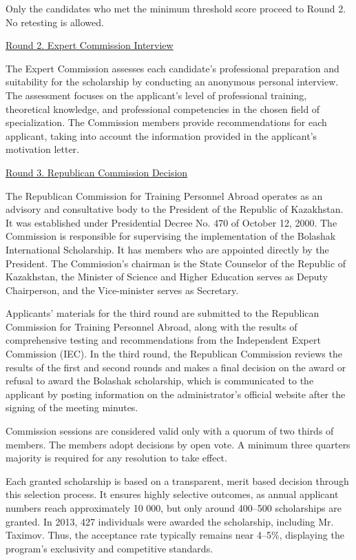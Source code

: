 Only the candidates who met the minimum threshold score proceed to Round 2. No retesting is allowed.

\underline{Round 2. Expert Commission Interview}

The Expert Commission assesses each candidate's professional preparation and suitability for the scholarship by conducting an anonymous personal interview. The assessment focuses on the applicant's level of professional training, theoretical knowledge, and professional competencies in the chosen field of specialization. The Commission members provide recommendations for each applicant, taking into account the information provided in the applicant's motivation letter.

\underline{Round 3. Republican Commission Decision}

The Republican Commission for Training Personnel Abroad operates as an advisory and consultative body to the President of the Republic of Kazakhstan. It was established under Presidential Decree No. 470 of October 12, 2000. The Commission is responsible for supervising the implementation of the Bolashak International Scholarship. It has members who are appointed directly by the President. The Commission’s chairman is the State Counselor of the Republic of Kazakhstan, the Minister of Science and Higher Education serves as Deputy Chairperson, and the Vice-minister serves as Secretary.

Applicants' materials for the third round are submitted to the Republican Commission for Training Personnel Abroad, along with the results of comprehensive testing and recommendations from the Independent Expert Commission (IEC). In the third round, the Republican Commission reviews the results of the first and second rounds and makes a final decision on the award or refusal to award the Bolashak scholarship, which is communicated to the applicant by posting information on the administrator's official website after the signing of the meeting minutes.

Commission sessions are considered valid only with a quorum of two thirds of members. The members adopt decisions by open vote. A minimum three quarters majority is required for any resolution to take effect.

Each granted scholarship is based on a transparent, merit based decision through this selection process. It ensures highly selective outcomes, as annual applicant numbers reach approximately 10 000, but only around 400--500 scholarships are granted. In 2013, 427 individuals were awarded the scholarship, including Mr. Taximov. Thus, the acceptance rate typically remains near 4--5\%, displaying the program's exclusivity and competitive standards.


